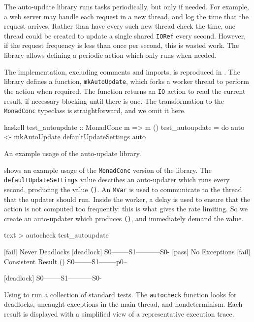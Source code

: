 The auto-update library \parencite{auto_update} runs tasks periodically, but
only if needed.  For example, a web server may handle each request in
a new thread, and log the time that the request arrives.  Rather than
have every such new thread check the time, one thread could be created
to update a single shared \verb|IORef| every second.  However, if the
request frequency is less than once per second, this is wasted work.
The library allows defining a periodic action which only runs when
needed.

The implementation, excluding comments and imports, is reproduced in
.  The library defines a function,
\verb|mkAutoUpdate|, which forks a worker thread to perform the action
when required.  The function returns an \verb|IO| action to read the
current result, if necessary blocking until there is one.  The
transformation to the \verb|MonadConc| typeclass is straightforward,
and we omit it here.

\begin{listing}
\centering
\begin{cminted}{haskell}
test_autoupdate :: MonadConc m => m ()
test_autoupdate = do
  auto <- mkAutoUpdate defaultUpdateSettings
  auto
\end{cminted}
\caption{An example usage of the auto-update library.}\label{lst:autoupdate_example1}
\end{listing}

 shows an example usage of the
\verb|MonadConc| version of the library.  The
\verb|defaultUpdateSettings| value describes an auto-updater which
runs every second, producing the value \verb|()|.  An \verb|MVar| is
used to communicate to the thread that the updater should run.  Inside
the worker, a delay is used to ensure that the action is not computed
too frequently: this is what gives the rate limiting.  So we create an
auto-updater which produces \verb|()|, and immediately demand the
value.

\begin{listing}
\centering
\begin{cminted}{text}
> autocheck test_autoupdate

[fail] Never Deadlocks
        [deadlock] S0--------S1-----------S0-
[pass] No Exceptions
[fail] Consistent Result
        () S0--------S1--------p0--

        [deadlock] S0--------S1-----------S0-
\end{cminted}
\caption[Using \dejafu{} to run a collection of standard tests.]{Using \dejafu{} to run a collection of standard tests.  The \texttt{autocheck} function looks for deadlocks, uncaught exceptions in the main thread, and nondeterminism.  Each result is displayed with a simplified view of a representative execution trace.}\label{lst:autoupdate_example2}
\end{listing}


